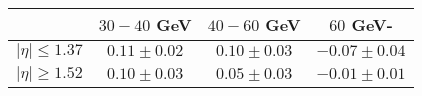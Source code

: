 \centering
\begin{tabular}{|c|c|c|c|} \toprule\toprule
 & $30-40$ GeV & $40-60$ GeV & $60$ GeV-\\\midrule
$\lvert \eta \rvert \leq 1.37$ & $0.11\pm0.02$ & $0.10\pm0.03$ & $-0.07\pm0.04$\\
$\lvert \eta \rvert \geq 1.52$ & $0.10\pm0.03$ & $0.05\pm0.03$ & $-0.01\pm0.01$\\
\bottomrule\bottomrule
\end{tabular}
